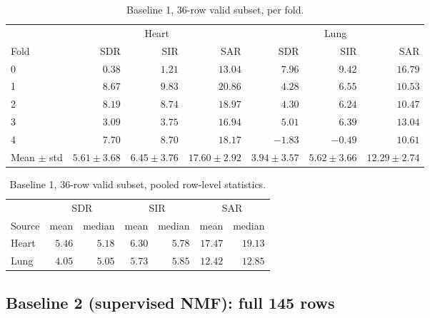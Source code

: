 \documentclass[11pt]{article}
\begin{document}
\begin{table}[H]
\centering
\caption{Baseline 1, 36-row valid subset, per fold.}
\small
\begin{tabular}{@{}lrrrrrr@{}}
\toprule
& \multicolumn{3}{c}{Heart} & \multicolumn{3}{c}{Lung} \\
Fold & SDR & SIR & SAR & SDR & SIR & SAR \\
\midrule
0 & $0.38$ & $1.21$ & $13.04$  & $7.96$  & $9.42$  & $16.79$ \\
1 & $8.67$ & $9.83$ & $20.86$  & $4.28$  & $6.55$  & $10.53$ \\
2 & $8.19$ & $8.74$ & $18.97$  & $4.30$  & $6.24$  & $10.47$ \\
3 & $3.09$ & $3.75$ & $16.94$  & $5.01$  & $6.39$  & $13.04$ \\
4 & $7.70$ & $8.70$ & $18.17$  & $-1.83$ & $-0.49$ & $10.61$ \\
\midrule
Mean $\pm$ std & $5.61\pm3.68$ & $6.45\pm3.76$ & $17.60\pm2.92$ & $3.94\pm3.57$ & $5.62\pm3.66$ & $12.29\pm2.74$ \\
\bottomrule
\end{tabular}
\end{table}

\begin{table}[H]
\centering
\caption{Baseline 1, 36-row valid subset, pooled row-level statistics.}
\small
\begin{tabular}{@{}lrrrrrr@{}}
\toprule
& \multicolumn{2}{c}{SDR} & \multicolumn{2}{c}{SIR} & \multicolumn{2}{c}{SAR} \\
Source & mean & median & mean & median & mean & median \\
\midrule
Heart & $5.46$ & $5.18$ & $6.30$ & $5.78$ & $17.47$ & $19.13$ \\
Lung  & $4.05$ & $5.05$ & $5.73$ & $5.85$ & $12.42$ & $12.85$ \\
\bottomrule
\end{tabular}
\end{table}

\subsection{Baseline 2 (supervised NMF): full 145 rows}
\end{document}
